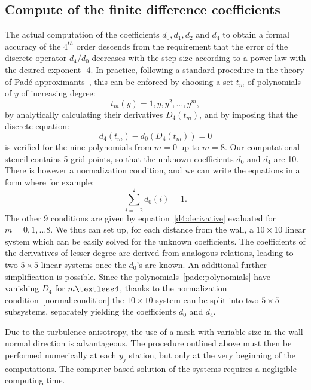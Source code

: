 \subsection{Compute of the finite difference coefficients}
The actual computation of the coefficients $d_{0}, d_{1}, d_{2}$ and $d_{4}$ to obtain a formal accuracy of the $4^{th}$ order descends from the requirement that the error of the discrete operator $d_{4} / d_{0}$
decreases with the step size according to a power law with the desired exponent -4. In practice, following a standard procedure in the theory of Padé approximants~\cite{Pade:approximants}, this can be enforced by choosing a set $t_{m}$ of polynomials of $y$ of increasing degree:
\begin{equation}
\label{pade:polynomials}
t_{m} (y) = 1, y, y^{2}, \dots , y^{m},
\end{equation}
 by analytically calculating their derivatives $D_{4}(t_{m})$, and by imposing that the discrete
equation:
\begin{equation}
\label{d4:derivative}
d_{4} (t_{m}) - d_{0} (D_{4}(t_{m})) = 0
\end{equation}
is verified for the nine polynomials from $m = 0$ up to $m = 8$.
Our computational stencil contains 5 grid points, so that the unknown coefficients $d_{0}$ and
$d_{4}$ are 10. There is however a normalization condition, and we can write the equations in a form where for example:
\begin{equation}
\label{normal:condition}
\sum_{i=-2}^{2} d_{0}(i) = 1.
\end{equation}
The other 9 conditions are given by equation~\ref{d4:derivative} evaluated for $m = 0, 1, \dots 8$. We thus can set up, for each distance from the wall, a $10\times10$ linear system which can be easily solved for the unknown coefficients. 
The coefficients of the derivatives of lesser degree are derived from analogous relations, leading to two $5\times5$ linear systems once the $d_{0}$’s are known. An additional further simplification is possible. Since the polynomials~\ref{pade:polynomials} have vanishing $D_{4}$ for $m \textless 4$, thanks to the normalization condition~\ref{normal:condition} the $10\times10$ system can be split into two $5\times5$ subsystems, separately yielding the coefficients $d_{0}$ and $d_{4}$.\par
Due to the turbulence anisotropy, the use of a mesh with variable size in the wall-normal direction is advantageous. The procedure outlined above must then be performed numerically at each $y_{j}$ station, but only at the very beginning of the computations. The computer-based solution of the systems requires a negligible computing time.\par

